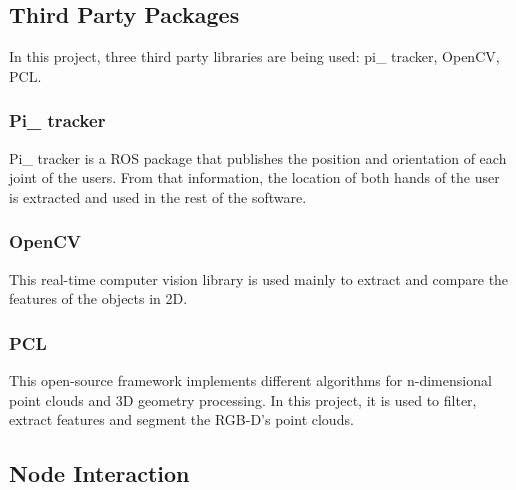 \documentclass{article}
\begin{document}
\subsection{Third Party Packages}
\hspace{0.5cm}In this project, three third party libraries are being used: pi\_ tracker, OpenCV, PCL. 
\subsubsection{ Pi\_ tracker}
Pi\_ tracker is a ROS package that publishes the position and orientation of each joint of the users. From that information, the location of both hands of the user is extracted and used in the rest of the software. 
\subsubsection{ OpenCV}
This real-time computer vision library is used mainly to extract and compare the features of the objects in 2D. 
\subsubsection{PCL}
This open-source framework implements different algorithms for n-dimensional point clouds and 3D geometry processing.
In this project, it is used to filter, extract features and segment the RGB-D's point clouds.

\subsection{Node Interaction}
\end{document}

